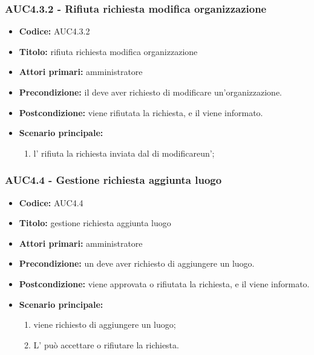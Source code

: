 \documentclass[casi-duso]{subfiles}
\begin{document}
\subsubsection{AUC4.3.2 - Rifiuta richiesta modifica organizzazione}%
\label{subsub:AUC4.3.2}
\begin{itemize}
  \item \textbf{Codice:} AUC4.3.2
  \item \textbf{Titolo:} rifiuta richiesta modifica organizzazione
  \item \textbf{Attori primari:} amministratore
  \item \textbf{Precondizione:} il  deve aver richiesto di modificare un'organizzazione.
  \item \textbf{Postcondizione:} viene rifiutata la richiesta, e il  viene informato.
  \item \textbf{Scenario principale:}
  \begin{enumerate}
    \item l' rifiuta la richiesta inviata dal  di modificareun';
  \end{enumerate}
\end{itemize}

\subsubsection{AUC4.4 - Gestione richiesta aggiunta luogo}%
\label{subsub:AUC4.4}
\begin{itemize}
  \item \textbf{Codice:} AUC4.4
  \item \textbf{Titolo:} gestione richiesta aggiunta luogo
  \item \textbf{Attori primari:} amministratore
  \item \textbf{Precondizione:} un  deve aver richiesto di aggiungere un luogo.
  \item \textbf{Postcondizione:} viene approvata o rifiutata la richiesta, e il  viene informato.
  \item \textbf{Scenario principale:}
  \begin{enumerate}
    \item viene richiesto di aggiungere un luogo;
    \item L' può accettare o rifiutare la richiesta.
  \end{enumerate}
\end{itemize}
\end{document}
